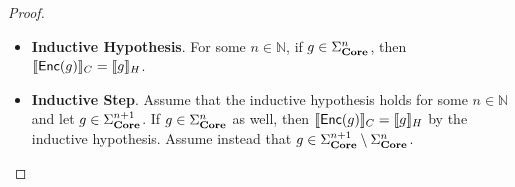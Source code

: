 \begin{proof}
\begin{itemize}
\begin{enumerate}
\begin{align*}
                        \\
                        &=
                        \exp( \alpha \Log( -Z ) )
                        =
                        \sem{g}_H
                    \end{align*}
              \item Let $g = \scalebox{0.65}{\circimg{tikz-cache/encoder__eqn5_lhs.pdf}}$.
                    Recall that $XZX = -Z$.
                    Then the following equation holds.
                    \begin{align*}
                        \sem*{\encoder(g)}_C
                        &=
                        \sem*{ \scalebox{0.65}{\circimg{tikz-cache/encoder__eqn5_rhs.pdf}} }_C
                        \\
                        &=
                        \exp( \Log(Z) ) \exp( \alpha \Log(X) ) \exp( \Log(Z) )
                        &
                        ( \text{by cases (3) and (4)} )
                        \\
                        &=
                        Z \exp( \alpha \Log(X) ) Z
                        \\
                        &=
                        \exp( \alpha Z \Log(X) Z )
                        &
                        ( \text{by~\cref{Eqn:UnitaryConj}} )
                        \\
                        &=
                        \exp( \alpha \Log( ZXZ ) )
                        &
                        ( \text{by~\cref{Eqn:UnitaryConj}} )
                        \\
                        &=
                        \exp( \alpha \Log( -X ) )
                        =
                        \sem{g}_H
                    \end{align*}
          \end{enumerate}
          Since $g \in \Sigma_{\Core}^0$ was arbitrary, then $\sem{\encoder(g)}_C = \sem{g}_H$ for all $g \in \Sigma_{\Core}^0$.
    \item \textbf{Inductive Hypothesis}.
          For some $n \in \mathbb{N}$, if $g \in \Sigma_{\mathbf{Core}}^n$, then $\sem{\encoder(g)}_C = \sem{g}_H$.
    \item \textbf{Inductive Step}.
          Assume that the inductive hypothesis holds for some $n \in \mathbb{N}$ and let $g \in \Sigma_{\mathbf{Core}}^{n+1}$.
          If $g \in \Sigma_{\mathbf{Core}}^n$ as well, then $\sem{\encoder(g)}_C = \sem{g}_H$ by the inductive hypothesis.
          Assume instead that $g \in \Sigma_{\mathbf{Core}}^{n+1} \setminus \Sigma_{\mathbf{Core}}^n$.

\end{itemize}
\end{proof}
